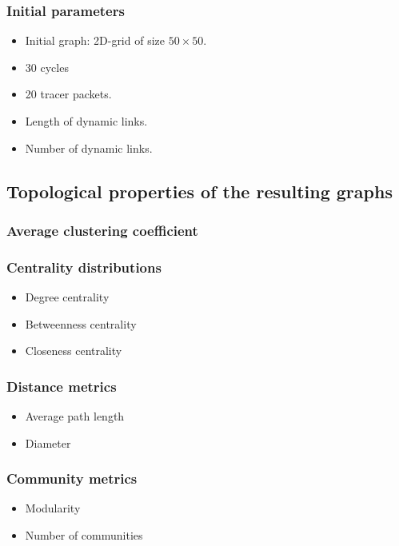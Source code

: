 \subsubsection{Initial parameters}

\begin{itemize}
	\item Initial graph: 2D-grid of size $50\times 50$.
	\item 30 cycles
	\item 20 tracer packets.
	\item Length of dynamic links.
	\item Number of dynamic links.
\end{itemize}


\subsection{Topological properties of the resulting graphs}

\subsubsection{Average clustering coefficient}

\subsubsection{Centrality distributions}
\begin{itemize}
	\item Degree centrality
	\item Betweenness centrality
	\item Closeness centrality
\end{itemize}

\subsubsection{Distance metrics}
\begin{itemize}
	\item Average path length
	\item Diameter
\end{itemize}

\subsubsection{Community metrics}
\begin{itemize}
	\item Modularity
	\item Number of communities
\end{itemize}

